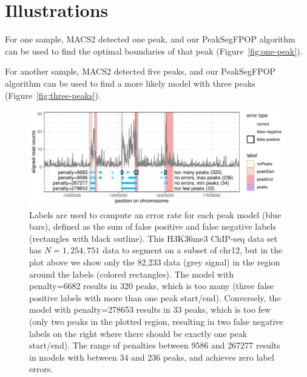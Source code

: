 \documentclass[article]{jss}
\newcommand{\fct}[1]{\code{#1()}}
\begin{document}
\section{Illustrations} \label{sec:illustrations}

For one sample, MACS2 detected one peak, and our PeakSegFPOP algorithm
can be used to find the optimal boundaries of that peak
(Figure~\ref{fig:one-peak}).

For another sample, MACS2 detected five peaks, and our PeakSegFPOP
algorithm can be used to find a more likely model with three peaks
(Figure~\ref{fig:three-peaks}).


\begin{figure}[t!]
\centering
\includegraphics{jss-figure-label-error}
\caption{\label{fig:label-error} Labels are used to compute an error
  rate for each peak model (blue bars), defined as the sum of false
  positive and false negative labels (rectangles with black
  outline). This H3K36me3 ChIP-seq data set has $N=1,254,751$ data to
  segment on a subset of chr12, but in the plot above we show only the
  82,233 data (grey signal) in the region around the labels (colored
  rectangles). The model with penalty=6682 results in 320 peaks, which
  is too many (three false positive labels with more than one peak
  start/end). Conversely, the model with penalty=278653 results in 33
  peaks, which is too few (only two peaks in the plotted region,
  resulting in two false negative labels on the right where there
  should be exactly one peak start/end). The range of penalties between 9586 and
  267277 results in models with between 34 and 236 peaks, and achieves
  zero label errors. }
\end{figure}
\end{document}
